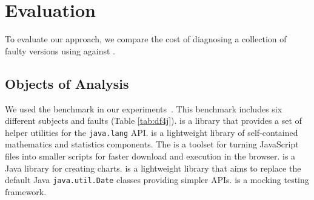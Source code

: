 \documentclass{article}
\begin{document}
%
%

\section{Evaluation}
\label{sec:eval}

To evaluate our approach, we compare the cost of diagnosing
a collection of faulty versions using \sfl{}
against \comb{}.

\subsection{Objects of Analysis}\label{sec:analysis}

We used the \dfj{} benchmark in our
experiments~\cite{just-defects4j-issta2014}. This benchmark includes
six different subjects and \numFaults{} faults (Table \ref{tab:df4j}).
\lang{} is a library that provides a set of helper utilities for the
     {\small\texttt{java.lang}} API. \cmath{} is a lightweight library
     of self-contained mathematics and statistics components. The
     \closure{} is a toolset for turning JavaScript files into smaller
     scripts for faster download and execution in the
     browser. \chart{} is a Java library for creating charts. \jtime{}
     is a lightweight library that aims to replace the default Java
     {\small\texttt{java.util.Date}} classes providing simpler
     APIs. \mockito{} is a mocking testing framework.
\end{document}
